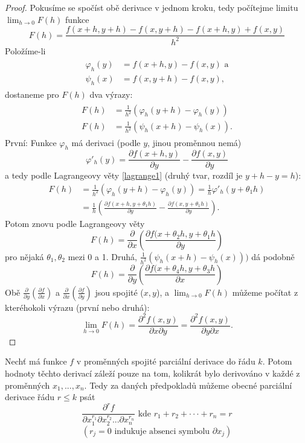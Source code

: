 \documentclass[../main.tex]{subfiles}
\begin{document}
\begin{proof}
	Pokusíme se spočíst obě derivace v jednom kroku, tedy počítejme limitu $\lim_{h\rightarrow 0} F(h)$ funkce
	\[F(h) = \frac{f(x+h,y+h) - f(x,y+h) - f(x+h,y) + f(x,y)}{h^2}\]
	Položíme-li 
	\begin{align*} 
		\begin{split}
			\varphi_h(y) & = f(x+h,y) - f(x,y)\text{ a}\\
			\psi_h(x) & = f(x,y+h) - f(x,y),
		\end{split}
	\end{align*}
	dostaneme pro $F(h)$ dva výrazy:
	\begin{align*} 
		\begin{split}
			F(h) & = \frac{1}{h^2} (\varphi_h(y+h) - \varphi_h(y))\\
			F(h) & = \frac{1}{h^2} (\psi_h(x+h)-\psi_h(x)).
		\end{split}
	\end{align*}
	První: Funkce $\varphi_h$ má derivaci (podle $y$, jinou proměnnou nemá)
	\[\varphi'_h(y)=\frac{\partial f(x+h,y)}{\partial y}-\frac{\partial f(x,y)}{\partial y}\]
	a tedy podle Lagrangeovy věty \ref{lagrange1} (druhý tvar, rozdíl je $y + h - y = h$):
	\begin{align*}
		F(h) & = \frac{1}{h^2}(\varphi_h(y+h)-\varphi_h(y)) = \frac{1}{h}\varphi'_h(y+\theta_1h)\\
		& = \frac{1}{h} \left ( \frac{\partial f(x+h,y+\theta_1h)}{\partial y} -\frac{\partial
		f(x,y+\theta_1h)}{\partial y} \right ).
	\end{align*}
	Potom znovu podle Lagrangeovy věty 
	\[F(h) = \frac{\partial }{\partial x}\left(\frac{\partial f(x+\theta_2h,y+\theta_1h}{\partial y}\right)\]
	pro nějaká $\theta_1,\theta_2$ mezi 0 a 1.
	Druhá, $\frac{1}{h^2}(\psi_h(x+h) - \psi_h(x)))$ dá podobně
	\[F(h) = \frac{\partial }{\partial y}\left(\frac{\partial f(x+\theta_4h,y + \theta_3h}{\partial x}\right)\]
	Obě $\frac{\partial }{\partial y}(\frac{\partial f}{\partial x})$ a $\frac{\partial }{\partial x}(\frac{\partial f}{\partial y})$ jsou spojité ($x,y$), a $\lim_{h\rightarrow 0} F(h)$ můžeme počítat z kteréhokoli výrazu (první nebo druhá):
	\[\lim_{h\rightarrow 0}F(h) = \frac{\partial ^2 f(x,y)}{\partial x \partial y} 
	                            = \frac{\partial ^2 f(x,y)}{\partial y \partial x}.\]
\end{proof}

\begin{consequence}
	Nechť má funkce $f$ v proměnných spojité parciální derivace do řádu $k$. Potom hodnoty těchto derivací
	záleží pouze na tom, kolikrát bylo derivováno v každé z proměnných $x_1, ... , x_n$.
	Tedy za daných předpokladů můžeme obecné parciální derivace řádu $r \leq k$ psát
	\[\frac{\partial ^r f}{\partial x^{r_1}_1 \partial x^{r_2}_2 ... \partial x_n^{r_n}} \text{ kde } r_1 + r_2 + \cdot \cdot \cdot + r_n = r \]
	\[(r_j = 0 \text{ indukuje absenci symbolu } \partial x_j)\]
\end{consequence}
\end{document}
